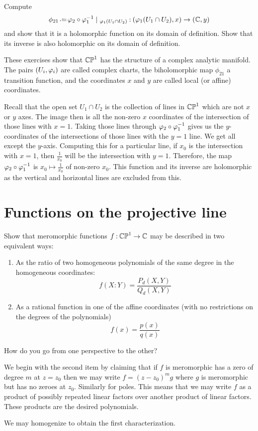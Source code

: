 \documentclass[12pt]{memoir}
\begin{document}
\begin{Ej}
    Compute 
    $$\phi_{21}\defeq \vf_2\circ\vf_1^{-1}\mid_{\vf_1(U_1\cap U_2)}\: (\vf_1(U_1\cap U_2),x)\to(\bC,y)$$
    and show that it is a holomorphic function on its domain of definition. Show that its inverse is also holomorphic on its domain of definition.
    
    These exercises show that $\mathbb{CP}^1$
     has the structure of a complex analytic manifold.
    The pairs $(U_i,\varphi_i)$
     are called complex charts, the biholomorphic map $\phi_{21}$
    a transition function, and the coordinates $x$
     and $y$
     are called local (or affine) coordinates.
\end{Ej}
\begin{ptcbr}
Recall that the open set $U_1\cap U_2$ is the collection of lines in $\mathbb{CP}^1$ which are not $x$ or $y$ axes. The image then is all the non-zero $x$ coordinates of the intersection of those lines with $x=1$. Taking those lines through $\varphi_2\circ\varphi_1^{-1}$ gives us the $y$-coordinates of the intersections of those lines with the $y=1$ line. We get all except the $y$-axis. Computing this for a particular line, if $x_0$ is the intersection with $x=1$, then $\frac{1}{x_0}$ will be the intersection with $y=1$. Therefore, the map $\varphi_2\circ\varphi_1^{-1}$ is $x_0\mapsto\frac{1}{x_0}$ of non-zero $x_0$. This function and its inverse are holomorphic as the vertical and horizontal lines are excluded from this.
\end{ptcbr}
\section{Functions on the projective line}

\begin{Ej}
    Show that meromorphic functions $f\mathbin{:} \mathbb{CP}^1\to\mathbb{C}$
    may be described in two equivalent ways:
    \begin{enumerate}
        \item As the ratio of two homogeneous polynomials of the same degree in the homogeneous coordinates:
        $$f(X:Y)=\frac{P_d(X,Y)}{Q_d(X,Y)}$$
        \item As a rational function in one of the affine coordinates (with no restrictions on the degrees of the polynomials)
        $$f(x)=\frac{p(x)}{q(x)}$$
    \end{enumerate}
   How do you go from one perspective to the other?
\end{Ej}

\begin{ptcbr}
We begin with the second item by claiming that if $f$ is meromorphic has a zero of degree $m$ at $z=z_0$ then we may write $f=(z-z_0)^mg$ where $g$ is meromorphic but has no zeroes at $z_0$. Similarly for poles. This means that we may write $f$ as a product of possibly repeated linear factors over another product of linear factors. These products are the desired polynomials.\par
We may homogenize to obtain the first characterization.\par   
{}
\end{ptcbr}
\newpage
\end{document}
